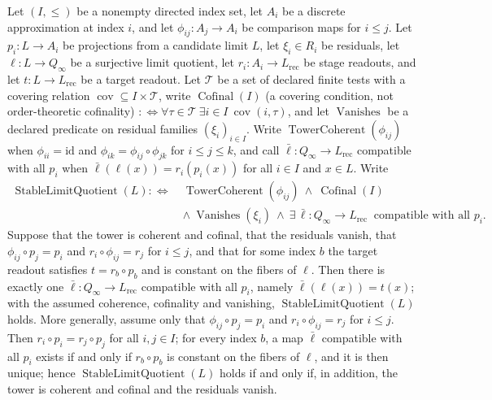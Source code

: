 \begin{theorem}\label{thm:F43}
Let \((I,\le)\) be a nonempty directed index set, let \(A_i\) be a discrete
approximation at index \(i\), and let
\(\phi_{ij}:A_j\to A_i\) be comparison maps for \(i\le j\). Let
\(p_i:L\to A_i\) be projections from a candidate limit \(L\), let
\(\xi_i\in R_i\) be residuals, let
\(\ell:L\to Q_\infty\) be a surjective limit quotient, let
\(r_i:A_i\to L_{\mathrm{rec}}\) be stage readouts, and let
\(t:L\to L_{\mathrm{rec}}\) be a target readout. Let \(\mathcal T\) be a set of
declared finite tests with a covering relation
\(\operatorname{cov}\subseteq I\times\mathcal T\), write
\(\operatorname{Cofinal}(I)\) (a covering condition, not order-theoretic
cofinality) \(:\Longleftrightarrow\forall\tau\in\mathcal T\ \exists i\in I\ \operatorname{cov}(i,\tau)\),
and let \(\operatorname{Vanishes}\) be a declared predicate on residual
families \((\xi_i)_{i\in I}\). Write \(\operatorname{TowerCoherent}(\phi_{ij})\)
when \(\phi_{ii}=\mathrm{id}\) and \(\phi_{ik}=\phi_{ij}\circ\phi_{jk}\) for
\(i\le j\le k\), and call \(\bar\ell:Q_\infty\to L_{\mathrm{rec}}\) compatible with
all \(p_i\) when \(\bar\ell(\ell(x))=r_i(p_i(x))\) for all \(i\in I\) and
\(x\in L\). Write
\begin{align*}
  \operatorname{StableLimitQuotient}(L)
  :\iff\
  &\operatorname{TowerCoherent}(\phi_{ij})
  \ \wedge\
  \operatorname{Cofinal}(I)\\
  &\wedge\
  \operatorname{Vanishes}(\xi_i)
  \ \wedge\
  \exists\,\bar\ell:Q_\infty\to L_{\mathrm{rec}}\ \text{ compatible with all }p_i .
\end{align*}
Suppose that the tower is coherent and cofinal, that the residuals vanish,
that \(\phi_{ij}\circ p_j=p_i\) and \(r_i\circ\phi_{ij}=r_j\) for \(i\le j\),
and that for some index \(b\) the target readout satisfies
\(t=r_b\circ p_b\) and is constant on the fibers of \(\ell\). Then there is exactly one \(\bar\ell:Q_\infty\to L_{\mathrm{rec}}\) compatible
with all \(p_i\), namely \(\bar\ell(\ell(x))=t(x)\); with the assumed coherence,
cofinality and vanishing, \(\operatorname{StableLimitQuotient}(L)\) holds. More generally, assume only that \(\phi_{ij}\circ p_j=p_i\) and
\(r_i\circ\phi_{ij}=r_j\) for \(i\le j\). Then \(r_i\circ p_i=r_j\circ p_j\) for all
\(i,j\in I\); for every index \(b\), a map \(\bar\ell\) compatible with all \(p_i\)
exists if and only if \(r_b\circ p_b\) is constant on the fibers of \(\ell\), and
it is then unique; hence \(\operatorname{StableLimitQuotient}(L)\) holds if and
only if, in addition, the tower is coherent and cofinal and the residuals
vanish.
\end{theorem}
